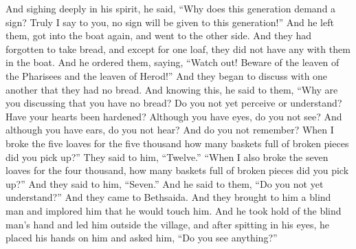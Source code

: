 \begin{biblechapter}
\verse And sighing deeply in his spirit, he said, “Why does this generation demand a sign? Truly I say to you, no sign will be given to this generation!”
\verse And he left them, got into the boat again, and went to the other side.
 And they had forgotten to take bread, and except for one loaf, they did not have any with them in the boat.
\verse And he ordered them, saying, “Watch out! Beware of the leaven of the Pharisees and the leaven of Herod!”
\verse And they began to discuss with one another that they had no bread.
\verse And knowing this, he said to them, “Why are you discussing that you have no bread? Do you not yet perceive or understand? Have your hearts been hardened?
\verse Although you have eyes, do you not see? And although you have ears, do you not hear? And do you not remember?
\verse When I broke the five loaves for the five thousand how many baskets full of broken pieces did you pick up?” They said to him, “Twelve.”
\verse “When I also broke the seven loaves for the four thousand, how many baskets full of broken pieces did you pick up?” And they said to him, “Seven.”
\verse And he said to them, “Do you not yet understand?”
 And they came to Bethsaida. And they brought to him a blind man and implored him that he would touch him.
\verse And he took hold of the blind man’s hand and led him outside the village, and after spitting in his eyes, he placed his hands on him and asked him, “Do you see anything?”

\end{biblechapter}

